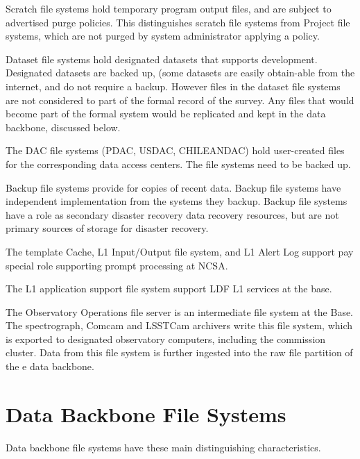 \documentclass[toc,DM,lsstdraft]{lsstdoc}
\begin{document}
Scratch file systems hold temporary program output files, and are
subject to advertised purge policies. This distinguishes scratch file
systems from Project file systems, which are not purged by system
administrator applying a policy.

Dataset file systems hold designated datasets that supports development.
Designated datasets are backed up, (some datasets are easily obtain-able
from the internet, and do not require a backup. However files in the
dataset file systems are not considered to part of the formal record of
the survey. Any files that would become part of the formal system would
be replicated and kept in the data backbone, discussed below.

The DAC file systems (PDAC, USDAC, CHILEANDAC) hold user-created files
for the corresponding data access centers. The file systems need to be
backed up.

Backup file systems provide for copies of recent data. Backup file
systems have independent implementation from the systems they backup.
Backup file systems have a role as secondary disaster recovery data
recovery resources, but are not primary sources of storage for disaster
recovery.

The template Cache, L1 Input/Output file system, and L1 Alert Log
support pay special role supporting prompt processing at NCSA.

The L1 application support file system support LDF L1 services at the
base.

The Observatory Operations file server is an intermediate file system at
the Base. The spectrograph, Comcam and LSSTCam archivers write this file
system, which is exported to designated observatory computers, including
the commission cluster. Data from this file system is further ingested
into the raw file partition of the e data backbone.

\section{Data Backbone File Systems}

Data backbone file systems have these main distinguishing
characteristics.
\end{document}
